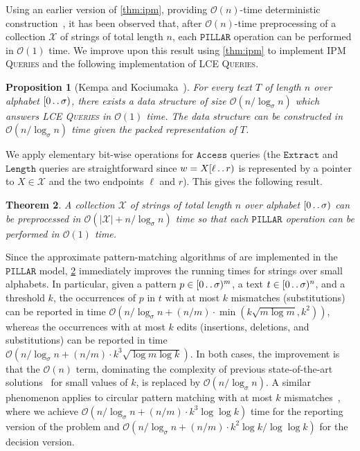 \documentclass[a4paper]{article}
\newtheorem{theorem}{Theorem}[section]
\newtheorem{proposition}[theorem]{Proposition}
\theoremstyle{definition}
\theoremstyle{remark}
\newcommand{\IPM}{\textsc{IPM Queries}\xspace}
\newcommand{\LCEQ}{\textsc{LCE Queries}\xspace}
\newcommand{\pillar}{\ensuremath{\mathtt{PILLAR}}\xspace}
\newcommand{\dd}{\mathinner{\ldotp\ldotp}}
\newcommand{\Oh}{\mathcal{O}}
\begin{document}
Using an earlier version of \cref{thm:ipm}, providing $\Oh(n)$-time deterministic construction~\cite{phd}, it has been observed \cite[Theorem 7.2]{DBLP:conf/focs/Charalampopoulos20} that, after $\Oh(n)$-time preprocessing of a collection $\mathcal{X}$ of strings of total length $n$,
each \pillar operation can be performed in $\Oh(1)$ time.
We improve upon this result using \cref{thm:ipm} to implement \IPM and
the following implementation of \LCEQ.
\begin{proposition}[Kempa and Kociumaka~\cite{Kempa2019}]\label{prop:lce}
For every text $T$ of length $n$ over alphabet $[0\dd \sigma)$, there exists a data structure of size $\Oh(n/\log_\sigma n)$ which answers \LCEQ in $\Oh(1)$ time. The data structure can be constructed in $\Oh(n/\log_\sigma n)$ time given the packed representation of $T$.
\end{proposition}

We apply elementary bit-wise operations for $\mathtt{Access}$ queries
(the $\mathtt{Extract}$ and $\mathtt{Length}$ queries are straightforward since $w=X[\ell\dd r)$ is represented by a pointer to $X\in \mathcal{X}$ and the two endpoints $\ell$ and $r$).
This gives the following result.

\begin{theorem}\label{thm:pillar}
A collection $\mathcal{X}$ of strings of total length $n$ over alphabet $[0\dd \sigma)$
can be preprocessed in $\Oh(|\mathcal{X}|+n/\log_\sigma n)$ time so that each \pillar operation can be performed in $\Oh(1)$ time.
\end{theorem}

Since the approximate pattern-matching algorithms of \cite{DBLP:conf/focs/Charalampopoulos20,DBLP:conf/focs/Charalampopoulos22,DBLP:conf/esa/Charalampopoulos22} are implemented in the \pillar model,
\cref{thm:pillar} immediately improves the running times for strings over small alphabets.
In particular, given a pattern $p\in [0\dd \sigma)^m$, a text $t\in [0\dd \sigma)^n$, and a threshold $k$, the occurrences of $p$ in $t$ with at most $k$ mismatches (substitutions) can be reported in time $\Oh(n/\log_\sigma n + (n/m)\cdot \min(k\sqrt{m\log m},k^2))$,
whereas the occurrences with at most $k$ edits (insertions, deletions, and substitutions) can be reported in time $\Oh(n/\log_\sigma n + (n/m)\cdot k^3\sqrt{\log m\log k})$. In both cases, the improvement is that the $\Oh(n)$ term, dominating the complexity of previous state-of-the-art solutions~\cite{DBLP:conf/stoc/ChanGKKP20,DBLP:conf/focs/Charalampopoulos22} for small values of $k$, is replaced by $\Oh(n/\log_\sigma n)$. 
A similar phenomenon applies to circular pattern matching with at most $k$ mismatches~\cite{DBLP:conf/esa/Charalampopoulos22}, where we achieve $\Oh(n/\log_\sigma n + (n/m)\cdot k^3 \log \log k)$ time for the reporting version of the problem and $\Oh(n/\log_\sigma n + (n/m)\cdot k^2 \log k/ \log \log k)$ for the decision version.
\end{document}
